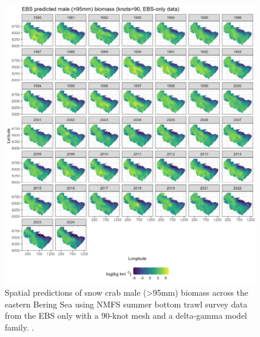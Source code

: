 \documentclass[
]{article}
\begin{document}
\begin{figure}

{\centering \includegraphics[width=1\linewidth,height=1\textheight]{../SNOW/Figures/EBS-90-DG-Male95_spatbio} 

}

\caption{Spatial predictions of snow crab male (>95mm) biomass across the eastern Bering Sea using NMFS summer bottom trawl survey data from the EBS only with a 90-knot mesh and a delta-gamma model family. .}\label{fig:snow-spatpred-bio-90-male-EBS}
\end{figure}
\end{document}
